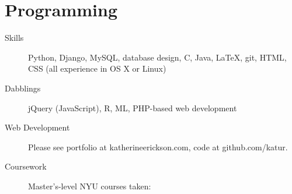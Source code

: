 \documentclass{article}
\begin{document}
	\section*{Programming}
	\begin{description}
			\item[Skills] Python, Django, MySQL, database design, C, Java, \LaTeX, git, HTML, CSS (all experience in OS X or Linux)
			\item[Dabblings] jQuery (JavaScript), R, ML, PHP-based web development
			\item[Web Development] Please see portfolio at katherineerickson.com, code at github.com/katur.
			\item[Coursework] Master's-level NYU courses taken:
				\footnotesize
				\begin{itemize}
				\end{itemize}
				\normalsize
	\end{description}
			
\end{document}
